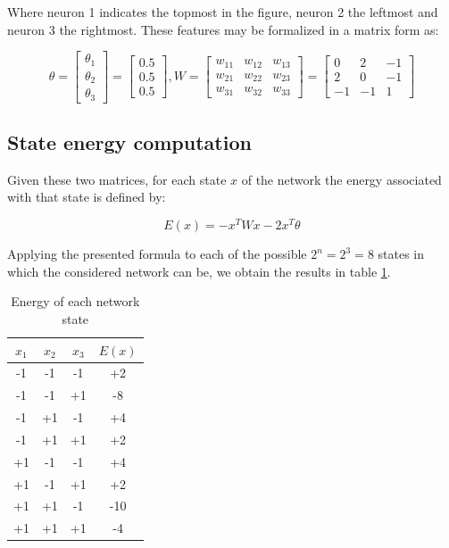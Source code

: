 \documentclass[letterpaper,headings=standardclasses]{scrartcl}
\begin{document}
Where neuron 1 indicates the topmost in the figure, neuron 2 the leftmost and neuron 3 the rightmost. These features may be formalized in a matrix form as:

$$ \theta = \left[ \begin{matrix} \theta_1 \\ \theta_2 \\ \theta_3 \end{matrix} \right] = \left[ \begin{matrix} 0.5 \\ 0.5 \\ 0.5 \end{matrix} \right], W = \left[ \begin{matrix} w_{11} & w_{12} & w_{13} \\ w_{21} & w_{22} & w_{23} \\ w_{31} & w_{32} & w_{33} \end{matrix} \right] = \left[ \begin{matrix} 0 & 2 & -1 \\ 2 & 0 & -1 \\ -1 & -1 & 1 \end{matrix} \right] $$

\subsection{State energy computation}

Given these two matrices, for each state $x$ of the network the energy associated with that state is defined by:

$$ E(x) = - x^T W x - 2 x^T \theta $$

Applying the presented formula to each of the possible $2^n = 2^3 = 8$ states in which the considered network can be, we obtain the results in table \ref{entable}.

\begin{table}[h]
    \centering
    \begin{tabular}{|c|c|c|c|}
    \hline
    $x_1$ & $x_2$ & $x_3$ & $E(x)$ \\ \hline
    -1 & -1 & -1 & +2 \\ \hline
    -1 & -1 & +1 & -8 \\ \hline
    -1 & +1 & -1 & +4 \\ \hline
    -1 & +1 & +1 & +2 \\ \hline
    +1 & -1 & -1 & +4 \\ \hline
    +1 & -1 & +1 & +2 \\ \hline
    +1 & +1 & -1 & -10 \\ \hline
    +1 & +1 & +1 & -4 \\ \hline
    \end{tabular}
    \caption{Energy of each network state}
    \label{entable}
\end{table}
\end{document}

